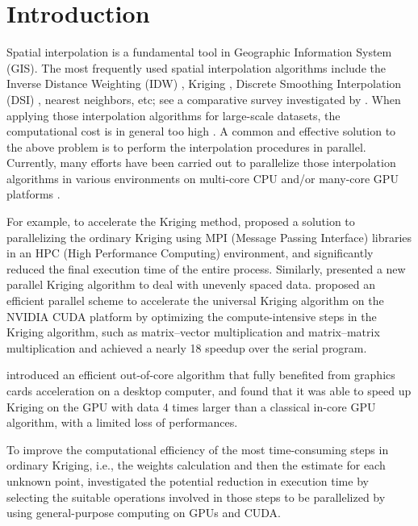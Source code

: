 \documentclass[final,5p,times,twocolumn,authoryear]{elsarticle}
\begin{document}
\section{Introduction}
\label{sec1:introduction}

Spatial interpolation is a fundamental tool in Geographic Information System 
(GIS). The most frequently used spatial interpolation algorithms include the 
Inverse Distance Weighting (IDW) \citep{01Shepard:1968:TIF:800186.810616}, Kriging \citep{02Krige1951JCMMS}, Discrete 
Smoothing Interpolation (DSI) \citep{03DBLP:journals/tog/Mallet89,04DBLP:journals/cad/Mallet92}, nearest neighbors, 
etc; see a comparative survey investigated by \cite{05DBLP:journals/gandc/FaliveneCTS10}. When applying those 
interpolation algorithms for large-scale datasets, the computational cost is 
in general too high \citep{06DBLP:journals/gandc/HuangY11}. A common and effective solution to 
the above problem is to perform the interpolation procedures in parallel. 
Currently, many efforts have been carried out to parallelize those 
interpolation algorithms in various environments on multi-core CPU and/or 
many-core GPU platforms \citep{07ISI:000320704100005}. 

For example, to accelerate the Kriging method, \cite{08DBLP:journals/gandc/PesquerCP11}
proposed a solution to parallelizing the ordinary Kriging using MPI (Message 
Passing Interface) libraries in an HPC (High Performance Computing) 
environment, and significantly reduced the final execution time of the 
entire process. Similarly, \cite{09DBLP:conf/para/StrzelczykP10} presented a new 
parallel Kriging algorithm to deal with unevenly spaced data. \cite{10DBLP:journals/gandc/Cheng13} proposed an efficient parallel scheme to accelerate 
the universal Kriging algorithm on the NVIDIA CUDA platform by optimizing 
the compute-intensive steps in the Kriging algorithm, such as matrix--vector 
multiplication and matrix--matrix multiplication and achieved a nearly 18 
speedup over the serial program.

 \cite{11DBLP:conf/iccS/AllombertMDBBAJ14} introduced an efficient out-of-core algorithm 
that fully benefited from graphics cards acceleration on a desktop computer, 
and found that it was able to speed up Kriging on the GPU with data 4 times 
larger than a classical in-core GPU algorithm, with a limited loss of 
performances.

To improve the computational efficiency of the most time-consuming steps in 
ordinary Kriging, i.e., the weights calculation and then the estimate for 
each unknown point, \cite{12DBLP:journals/gandc/RaveJAG14} investigated the 
potential reduction in execution time by selecting the suitable operations 
involved in those steps to be parallelized by using general-purpose 
computing on GPUs and CUDA. 
\end{document}
